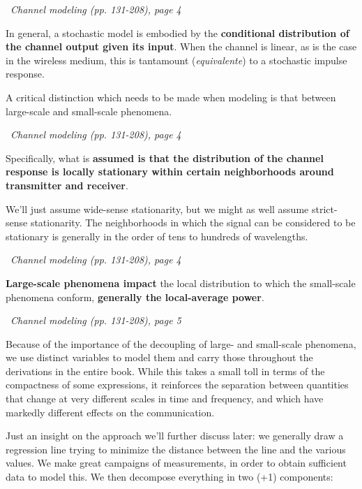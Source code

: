 \documentclass[a4paper, 12pt]{book}
\begin{document}
\begin{yellowbox}
\faBook\ \textit{Channel modeling (pp. 131-208), page 4}

In general, a stochastic model is embodied by the \textbf{conditional distribution of the channel output given its input}. When the channel is linear, as is the case in the wireless medium, this is tantamount (\textit{equivalente}) to a stochastic impulse response.
\end{yellowbox}

A critical distinction which needs to be made when modeling is that between large-scale and small-scale phenomena.

\begin{yellowbox}
\faBook\ \textit{Channel modeling (pp. 131-208), page 4}

Specifically, what is \textbf{assumed is that the distribution of the channel response is locally stationary within certain neighborhoods around transmitter and receiver}.
\end{yellowbox}

We'll just assume wide-sense stationarity, but we might as well assume strict-sense stationarity.
The neighborhoods in which the signal can be considered to be stationary is generally in the order of tens to hundreds of wavelengths.

\newpage

\begin{yellowbox}
\faBook\ \textit{Channel modeling (pp. 131-208), page 4}

\textbf{Large-scale phenomena impact} the local distribution to which the small-scale phenomena conform, \textbf{generally the local-average power}.
\end{yellowbox}

\begin{yellowbox}
\faBook\ \textit{Channel modeling (pp. 131-208), page 5}

Because of the importance of the decoupling of large- and small-scale phenomena, we use distinct variables to model them and carry those throughout the derivations in the entire book. While this takes a small toll in terms of the compactness of some expressions, it reinforces the separation between quantities that change at very different scales in time and frequency, and which have markedly different effects on the communication.
\end{yellowbox}

Just an insight on the approach we'll further discuss later: we generally draw a regression line trying to minimize the distance between the line and the various values.
We make great campaigns of measurements, in order to obtain sufficient data to model this. We then decompose everything in two (+1) components:
\end{document}
